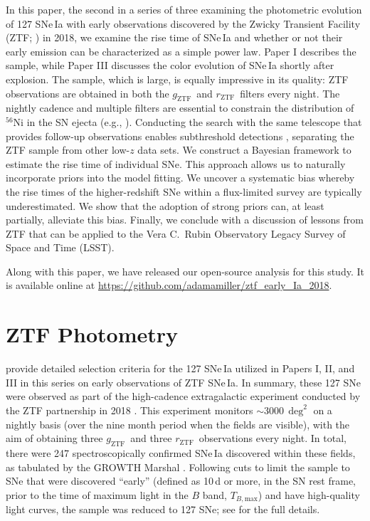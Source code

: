 \documentclass[twocolumn]{./aastex63}
\newcommand{\rztf}{$r_\mathrm{ZTF}$}
\newcommand{\gztf}{$g_\mathrm{ZTF}$}
\newcommand{\tbmax}{$T_{B,\mathrm{max}}$}
\begin{document}
In this paper, the second in a series of three examining the photometric
evolution of 127 SNe\,Ia with early observations discovered by the Zwicky
Transient Facility (ZTF; \citealt{Bellm19,Graham19,Dekany20}) in 2018, we
examine the rise time of SNe\,Ia and whether or not their early emission can be
characterized as a simple power law. Paper I \citep{Yao19} describes the
sample, while Paper III \citep{Bulla20} discusses the color evolution
of SNe\,Ia shortly after explosion. The sample, which is large, is equally
impressive in its quality: ZTF observations are obtained in both the \gztf\
and \rztf\ filters every night. The nightly cadence and multiple
filters are essential to constrain the distribution of $^{56}$Ni in the SN
ejecta (e.g., \citealt{Magee20}). Conducting the search with the same
telescope that provides follow-up observations enables subthreshold
detections \citep{Yao19}, separating the ZTF sample from other low-$z$ data
sets. We construct a Bayesian framework to estimate the rise time of
individual SNe. This approach allows us to naturally incorporate
priors into the model fitting. We uncover a systematic bias whereby the rise
times of the higher-redshift SNe within a flux-limited survey are typically
underestimated. We show that the adoption of strong priors can, at least
partially, alleviate this bias. Finally, we conclude with a discussion of
lessons from ZTF that can be applied to the Vera C.~Rubin Observatory
Legacy Survey of Space and Time (LSST).

Along with this paper, we have released our open-source analysis for this
study. It is available online at
\href{https://github.com/adamamiller/ztf_early_Ia_2018}
{\url{https://github.com/adamamiller/ztf_early_Ia_2018}}.

\section{ZTF Photometry}\label{sec:ztf}

\citet{Yao19} provide detailed selection criteria for the 127 SNe\,Ia utilized
in Papers I, II, and III in this series on early observations of ZTF SNe\,Ia.
In summary, these 127 SNe were observed as part of the high-cadence
extragalactic experiment conducted by the ZTF partnership in 2018
\citep{Bellm19a}. This experiment monitors $\sim$3000\,$\deg^2$ on a nightly
basis (over the nine month period when the fields are visible), with the aim
of obtaining three \gztf\ and three \rztf\ observations every night. In total,
there were 247 spectroscopically confirmed SNe\,Ia discovered within these
fields, as tabulated by the GROWTH Marshal \citep{Kasliwal19}.
Following cuts to limit the sample to SNe that were discovered ``early''
(defined as 10\,d or more, in the SN rest frame, prior to the time of maximum
light in the $B$ band, \tbmax) and have high-quality light curves, the sample
was reduced to 127 SNe; see \citep{Yao19} for the full details.
\end{document}
